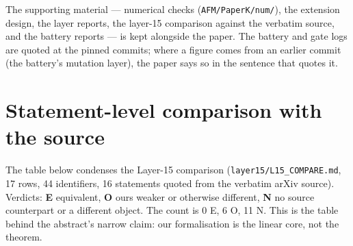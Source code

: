 \documentclass[11pt]{article}
\theoremstyle{definition}
\theoremstyle{remark}
\begin{document}
The supporting material --- numerical checks (\texttt{AFM/PaperK/num/}), the extension design, the
layer reports, the layer-15 comparison against the verbatim source, and the battery reports --- is
kept alongside the paper. The battery and gate logs are quoted at the pinned commits; where a
figure comes from an earlier commit (the battery's mutation layer), the paper says so in the
sentence that quotes it.


\appendix
\section{Statement-level comparison with the source}\label{app:l15}

The table below condenses the Layer-15 comparison (\texttt{layer15/L15\_COMPARE.md}, 17 rows, 44
identifiers, 16 statements quoted from the verbatim arXiv source). Verdicts: \textbf{E} equivalent,
\textbf{O} ours weaker or otherwise different, \textbf{N} no source counterpart or a different object.
The count is 0 E, 6 O, 11 N. This is the table behind the abstract's narrow claim: our formalisation is
the linear core, not the theorem.
\end{document}
